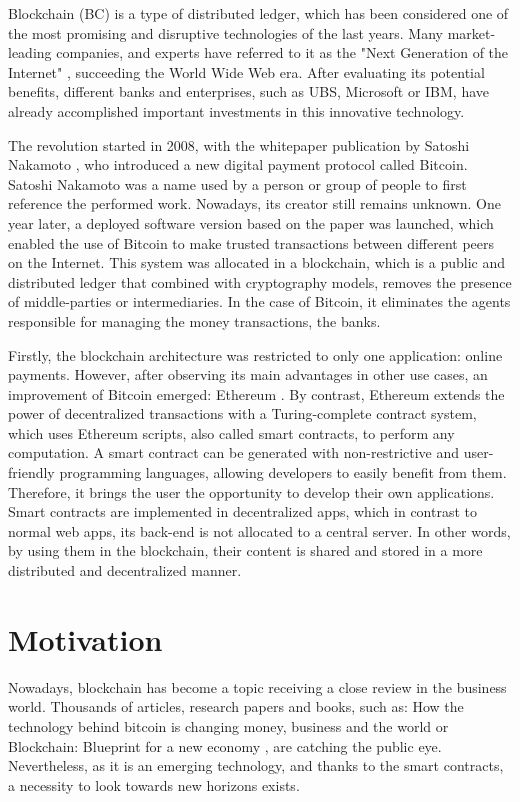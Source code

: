 Blockchain (BC) is a type of distributed ledger, which has been considered one of the most promising and disruptive technologies of the last years. Many market-leading companies, and experts have referred to it as the "Next Generation of the Internet" \cite{JenClarck2017}, succeeding the World Wide Web era. After evaluating its potential benefits, different banks and enterprises, such as UBS, Microsoft or IBM, have already accomplished important investments in this innovative technology.

The revolution started in 2008, with the whitepaper publication by Satoshi Nakamoto \cite{nakamoto2008bitcoin}, who introduced a new digital payment protocol called Bitcoin. Satoshi Nakamoto was a name used by a person or group of people to first reference the performed work. Nowadays, its creator still remains unknown. One year later, a deployed software version based on the paper was launched, which enabled the use of Bitcoin to make trusted transactions between different peers on the Internet. This system was allocated in a blockchain, which is a public and distributed ledger that combined with cryptography models, removes the presence of middle-parties or intermediaries. In the case of Bitcoin, it eliminates the agents responsible for managing the money transactions, the banks.

Firstly, the blockchain architecture was restricted to only one application: online payments. However, after observing its main advantages in other use cases, an improvement of Bitcoin emerged: Ethereum \citep{buterin2014next}. By contrast, Ethereum extends the power of decentralized transactions with a Turing-complete contract system, which uses Ethereum scripts, also called smart contracts, to perform any computation. A smart contract can be generated with non-restrictive and user-friendly programming languages, allowing developers to easily benefit from them. Therefore, it brings the user the opportunity to develop their own applications. Smart contracts are implemented in decentralized apps, which in contrast to normal web apps, its back-end is not allocated to a central server. In other words, by using them in the blockchain, their content is shared and stored in a more distributed and decentralized manner.

\section{Motivation}

Nowadays, blockchain has become a topic receiving a close review in the business world. Thousands of articles, research papers and books, such as: How the technology behind bitcoin is changing money, business and the world \cite{tapscott2016blockchain} or Blockchain: Blueprint for a new economy \cite{swan2015blockchain}, are catching the public eye. Nevertheless, as it is an emerging technology, and thanks to the smart contracts, a necessity to look towards new horizons exists.

